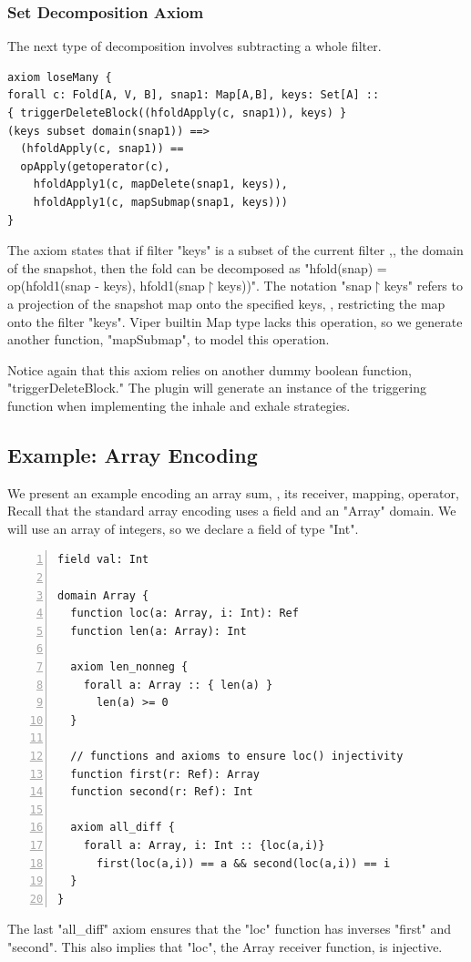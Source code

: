 \documentclass[msc,oneside]{ubcthesis}
\begin{document}
\subsubsection{Set Decomposition Axiom}
The next type of decomposition involves subtracting a whole filter.
\begin{lstlisting}
axiom loseMany {
forall c: Fold[A, V, B], snap1: Map[A,B], keys: Set[A] ::
{ triggerDeleteBlock((hfoldApply(c, snap1)), keys) }
(keys subset domain(snap1)) ==>
  (hfoldApply(c, snap1)) ==
  opApply(getoperator(c), 
    hfoldApply1(c, mapDelete(snap1, keys)),
    hfoldApply1(c, mapSubmap(snap1, keys)))
}
\end{lstlisting}
The axiom states that if filter "keys" is a subset of the current filter ,\ie, the domain of the snapshot, then the fold can be decomposed as "hfold(snap) = op(hfold1(snap - keys), hfold1(snap$\upharpoonright$keys))". The notation "snap$\upharpoonright$keys" refers to a projection of the snapshot map onto the specified keys, \ie, restricting the map onto the filter "keys". Viper builtin Map type lacks this operation, so we generate another function, "mapSubmap", to model this operation. 

Notice again that this axiom relies on another dummy boolean function, "triggerDeleteBlock." The plugin will generate an instance of the triggering function when implementing the inhale and exhale strategies. 

\subsection{Example: Array Encoding}
We present an example encoding an array sum, \ie, its receiver, mapping, operator, \etc Recall that the standard array encoding uses a field and an "Array" domain. We will use an array of integers, so we declare a field of type "Int".
\begin{lstlisting}[language=silver,numbers=left, firstnumber=1, stepnumber=1]
field val: Int

domain Array {
  function loc(a: Array, i: Int): Ref
  function len(a: Array): Int

  axiom len_nonneg {
    forall a: Array :: { len(a) }
      len(a) >= 0
  }

  // functions and axioms to ensure loc() injectivity
  function first(r: Ref): Array
  function second(r: Ref): Int  

  axiom all_diff {
    forall a: Array, i: Int :: {loc(a,i)}
      first(loc(a,i)) == a && second(loc(a,i)) == i
  }
}
\end{lstlisting}
The last "all_diff" axiom ensures that the "loc" function has inverses "first" and "second". This also implies that "loc", the Array receiver function, is injective. 
\end{document}
